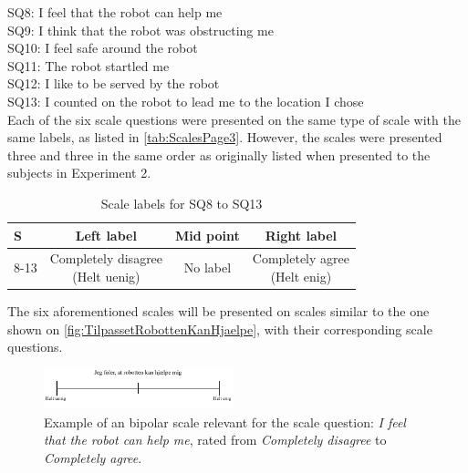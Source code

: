 \noindent
% 
SQ8: I feel that the robot can help me\\%
SQ9: I think that the robot was obstructing me\\%
SQ10: I feel safe around the robot\\%
SQ11: The robot startled me\\ %
SQ12: I like to be served by the robot\\%
SQ13: I counted on the robot to lead me to the location I chose\\%
Each of the six scale questions were presented on the same type of scale with the same labels, as listed in \autoref{tab:ScalesPage3}. However, the scales were presented three and three in the same order as originally listed when presented to the subjects in Experiment 2.
%
\begin{table}[H]
	\centering
\caption{Scale labels for SQ8 to SQ13}
	\label{tab:ScalesPage3} 
	\begin{tabular}{l|c|c|c}
		S     & Left label & Mid point & Right label \\\hline
		8-13   & \makecell{Completely disagree\\(Helt uenig)}  & No label & \makecell{Completely agree\\(Helt enig)}                      
	\end{tabular}        
\end{table}
\noindent
%
The six aforementioned scales will be presented on scales similar to the one shown on \autoref{fig:TilpassetRobottenKanHjaelpe}, with their corresponding scale questions. 
%
\begin{figure}[H]
\centering
\includegraphics[width = 0.49\textwidth]{Figure/TilpassetRobottenKanHjaelpe}
\setlength{} 
\caption{Example of an bipolar scale relevant for the scale question: \textit{I feel that the robot can help me}, rated from \textit{Completely disagree} to \textit{Completely agree}.}
\label{fig:TilpassetRobottenKanHjaelpe}
\end{figure}
